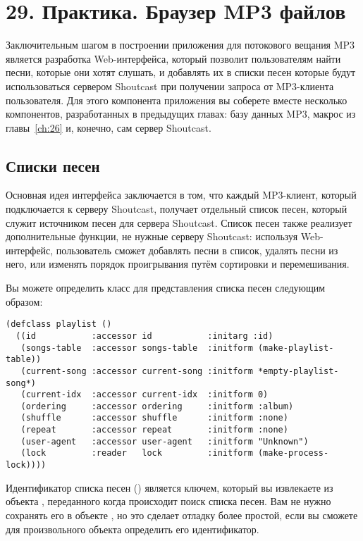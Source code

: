 \chapter{29. Практика. Браузер MP3 файлов}

Заключительным шагом в построении приложения для потокового вещания MP3 является
разработка Web-интерфейса, который позволит пользователям найти песни, которые они хотят
слушать, и добавлять их в списки песен которые будут использоваться сервером Shoutcast при
получении запроса от MP3-клиента пользователя.  Для этого компонента приложения вы
соберете вместе несколько компонентов, разработанных в предыдущих главах: базу данных MP3,
макрос  из главы~\ref{ch:26} и, конечно, сам сервер Shoutcast.

\section{Списки песен}

Основная идея интерфейса заключается в том, что каждый MP3-клиент, который подключается к
серверу Shoutcast, получает отдельный список песен, который служит источником песен для
сервера Shoutcast.  Список песен также реализует дополнительные функции, не нужные серверу
Shoutcast: используя Web-интерфейс, пользователь сможет добавлять песни в список, удалять
песни из него, или изменять порядок проигрывания путём сортировки и перемешивания.

Вы можете определить класс для представления списка песен следующим образом:

\begin{lstlisting}
(defclass playlist ()
  ((id           :accessor id           :initarg :id)
   (songs-table  :accessor songs-table  :initform (make-playlist-table))
   (current-song :accessor current-song :initform *empty-playlist-song*)
   (current-idx  :accessor current-idx  :initform 0)
   (ordering     :accessor ordering     :initform :album)
   (shuffle      :accessor shuffle      :initform :none)
   (repeat       :accessor repeat       :initform :none)
   (user-agent   :accessor user-agent   :initform "Unknown")
   (lock         :reader   lock         :initform (make-process-lock))))
\end{lstlisting}

Идентификатор списка песен () является ключем, который вы извлекаете из объекта
, переданного  когда происходит поиск списка песен.
Вам не нужно сохранять его в объекте , но это сделает отладку более
простой, если вы сможете для произвольного объекта  определить его
идентификатор.

